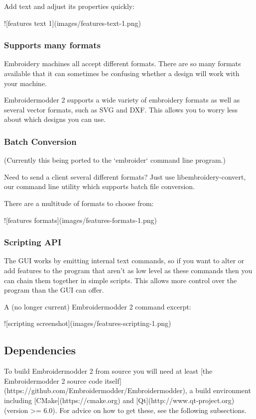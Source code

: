 Add text and adjust its properties quickly:

![features text 1](images/features-text-1.png)

\subsubsection{Supports many formats}

Embroidery machines all accept different formats. There are so many formats available that it
can sometimes be confusing whether a design will work with your machine.

Embroidermodder 2 supports a wide variety of embroidery formats as well as several vector
formats, such as SVG and DXF. This allows you to worry less about which designs you can use.

\subsubsection{Batch Conversion}

(Currently this being ported to the `embroider` command line program.)

Need to send a client several different formats? Just use libembroidery-convert, our command
line utility which supports batch file conversion.

There are a multitude of formats to choose from:

![features formats](images/features-formats-1.png)

\subsubsection{Scripting API}

The GUI works by emitting internal text commands, so if you want to alter
or add features to the program that aren't as low level as these commands then you
can chain them together in simple scripts. This allows more control over the program than
the GUI can offer.

A (no longer current) Embroidermodder 2 command excerpt:

![scripting screenshot](images/features-scripting-1.png)

\subsection{Dependencies}

To build Embroidermodder 2 from source you will need at least
[the Embroidermodder 2 source code itself](https://github.com/Embroidermodder/Embroidermodder),
a build environment including [CMake](https://cmake.org) and [Qt](http://www.qt-project.org) (version >= 6.0). For advice on how to get these,
see the following subsections.

